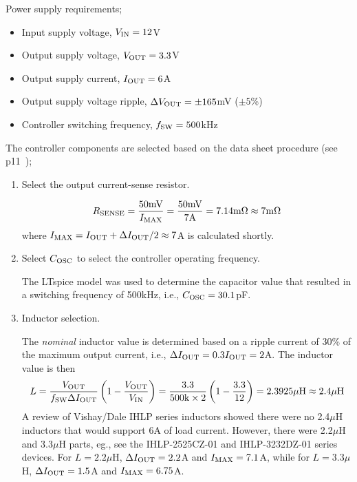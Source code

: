 Power supply requirements;
%
\begin{itemize}
\item Input supply voltage, $V_{\rm IN} = 12$V
\item Output supply voltage, $V_{\rm OUT} = 3.3$V
\item Output supply current, $I_{\rm OUT} = 6$A
\item Output supply voltage ripple, $\Delta V_{\rm OUT} = \pm 165$mV ($\pm5$\%)
\item Controller switching frequency, $f_{\rm SW} = 500$kHz
\end{itemize}
%
The controller components are selected based on the data
sheet procedure (see p11~\cite{Linear_LTC1735_1998});
%
\begin{enumerate}
\item Select the output current-sense resistor.

\begin{equation}
R_{\rm SENSE} = \frac{50\text{mV}}{I_{\rm MAX}} =
\frac{50\text{mV}}{7\text{A}} = 7.14\text{m}\Omega \approx  7\text{m}\Omega 
\end{equation}
%
where $I_{\rm MAX} = I_{\rm OUT} + \Delta I_{\rm OUT}/2 \approx 7$A is calculated
shortly.
%
\item Select $C_{\rm OSC}$ to select the controller operating
frequency.

The LTspice model was used to determine the capacitor value that
resulted in a switching frequency of 500kHz, i.e., 
$C_{\rm OSC} = 30.1$pF.

\item Inductor selection.

The {\em nominal} inductor value is determined based on a ripple current of
30\% of the maximum output current, i.e., 
$\Delta I_{\rm OUT} = 0.3I_{\rm OUT} = 2$A. The inductor value 
is then
%
\begin{equation}
L = \frac{V_{\rm OUT}}{f_{\rm SW}\Delta I_{\rm OUT}}\left(
1 - \frac{V_{\rm OUT}}{V_{\rm IN}}\right) =
\frac{3.3}{500\text{k}\times2}\left(
1 - \frac{3.3}{12}\right) = 2.3925\mu\text{H} \approx 2.4\mu\text{H}
\end{equation}
%
A review of Vishay/Dale IHLP series inductors showed there were
no 2.4$\mu$H inductors that would support 6A of load current.
However, there were 2.2$\mu$H and 3.3$\mu$H parts,
eg., see the IHLP-2525CZ-01 and IHLP-3232DZ-01 series devices.
For $L = 2.2\mu$H, $\Delta I_{\rm OUT} = 2.2$A and 
$I_{\rm MAX} = 7.1$A, while for $L = 3.3\mu$H, 
$\Delta I_{\rm OUT} = 1.5$A and $I_{\rm MAX} = 6.75$A.


\end{enumerate}
